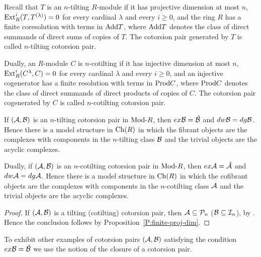  Recall that $T$ is an $n$-tilting $R$-module if it has projective dimension at most $n$, $\operatorname{Ext}^i_R(T, T^{(\lambda)})=0$ for every cardinal $\lambda$ and every $i\geq 0$, and  the ring $R$ has a finite coresolution with terms in $\mathrm{Add} T$, where $\mathrm{Add} T$ denotes the class of direct summands of direct sums of copies of $T$.
 The cotorsion pair generated by $T$ is called $n$-tilting cotorsion pair.

 Dually, an $R$-module $C$ is $n$-cotilting if it has injective dimension at most $n$, $\operatorname{Ext}^i_R(C^{\lambda}, C)=0$ for every cardinal $\lambda$ and every $i\geq 0$, and  an injective cogenerator has a finite resolution with terms in $\mathrm{Prod} C$, where $\mathrm{Prod} C$ denotes the class of direct summands of direct products of copies of $C$.
 The cotorsion pair cogenerated by $C$ is called $n$-cotilting cotorsion pair.

  \begin{prop}\label{P:tilt-cotil} If $(\mathcal{A}, \mathcal{B})$ is an $n$-tilting cotorsion pair in $\mathrm{Mod}\textrm{-}{R}$, then $ex\mathcal{B}= \tilde {\mathcal{B}}$ and $dw\mathcal{B}=dg\mathcal{B}$. Hence there is a model structure in $\mathrm{Ch}(R)$ in which the fibrant objects are the complexes with components in the  $n$-tilting class $\mathcal{B}$ and the trivial objects are the acyclic complexes.

 Dually, if $(\mathcal{A}, \mathcal{B})$ is an $n$-cotilting cotorsion pair in $\mathrm{Mod}\textrm{-}{R}$, then $ex\mathcal{A}= \tilde {\mathcal{A}}$ and $dw\mathcal{A}=dg\mathcal{A}$.
 Hence there is a model structure in $\mathrm{Ch}(R)$ in which the cofibrant objects are the complexes with components in the  $n$-cotilting class $\mathcal{A}$ and the trivial objects are the acyclic complexes.
 \end{prop}

%
 \begin{proof}
 \begin{sloppypar}
   If $(\mathcal{A}, \mathcal{B})$ is a tilting (cotilting) cotorsion pair, then ${\mathcal{A}\subseteq \mathcal{P}_n}$ ($\mathcal{B}\subseteq \mathcal{I}_n$), by \cite[Lemmas 13.10, 15.4]{GT12}. Hence the conclusion follows by Proposition~\ref{P:finite-proj-dim}.
 \end{sloppypar}
\end{proof}
%
%
%
To exhibit other examples of cotorsion pairs $(\mathcal{A}, \mathcal{B})$ satisfying the condition $ex\mathcal{B}=\tilde {\mathcal{B}}$ we use the notion of the closure of a cotorsion pair.

